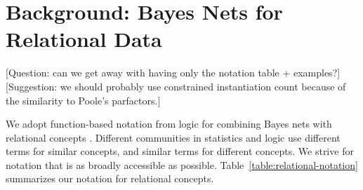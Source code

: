 \documentclass[twoside,11pt]{article}
\begin{document}
\section{Background: Bayes Nets for Relational Data} \label{sec:background} [Question: can we get away with having only the notation table + examples?] [Suggestion: we should probably use constrained instantiation count because of the similarity to Poole's parfactors.]

We adopt function-based notation from logic for combining Bayes nets with relational concepts \cite{Russell2010,Poole2003,Getoor2006,Chiang2012}. Different communities in statistics and logic use different terms for similar concepts, and similar terms for different concepts. We strive for notation that is as broadly accessible as possible. Table~\ref{table:relational-notation} summarizes our notation for relational concepts. %
\end{document}
